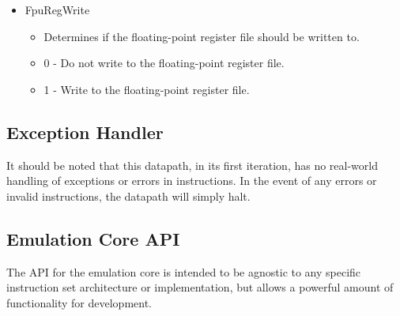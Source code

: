 \documentclass[
    paper=letter,
    parskip=half,
    fontsize=12pt,
    titlepage=firstiscover,
    toc=bibliography,
    numbers=endperiod
]{scrartcl}
\providecommand{\tightlist}{%
  \setlength{\itemsep}{0pt}\setlength{\parskip}{0pt}}
\begin{document}
\begin{itemize}
    \item FpuRegWrite
          \begin{itemize}
              \tightlist
              \item Determines if the floating-point register file should be written to.
              \item 0 - Do not write to the floating-point register file.
              \item 1 - Write to the floating-point register file.
          \end{itemize}
\end{itemize}

\subsection{Exception Handler}

It should be noted that this datapath, in its first iteration, has no
real-world handling of exceptions or errors in instructions. In the
event of any errors or invalid instructions, the datapath will simply
halt.

\subsection{Emulation Core API}
\label{subsec:emulation-core-api}

The API for the emulation core is intended to be agnostic to any
specific instruction set architecture or implementation, but allows a
powerful amount of functionality for development.
\end{document}
